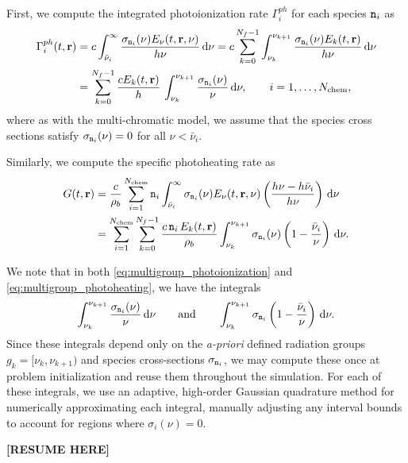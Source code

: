 \documentclass[10pt]{article}
\renewcommand{\(}{\left(}
\renewcommand{\)}{\right)}
\newcommand{\rvec}{{\bf r}}
\newcommand{\rhob}{\rho_b}
\newcommand{\Enu}{E_{\nu}}
\newcommand{\mn}{{\tt n}}
\begin{document}
First, we compute the integrated photoionization rate $\Gamma_i^{ph}$
for each species $\mn_i$ as 
\begin{align}
\label{eq:multigroup_photoionization}
   \Gamma_i^{ph}(t,\rvec)  &= 
   c \int_{\bar{\nu}_i}^{\infty} \frac{\sigma_{\mn_i}(\nu)\Enu(t,\rvec,\nu)}{h\nu}\,\mathrm d\nu =  
   c \sum_{k=0}^{N_f-1} \int_{\nu_k}^{\nu_{k+1}} \frac{\sigma_{\mn_i}(\nu) E_k(t,\rvec)}{h\nu}\,\mathrm d\nu \\
\notag
   &= \sum_{k=0}^{N_f-1} \frac{c E_k(t,\rvec)}{h}\,
   \int_{\nu_k}^{\nu_{k+1}} \frac{\sigma_{\mn_i}(\nu)}{\nu}\,\mathrm
   d\nu, \qquad i=1,\ldots,N_\text{chem},
\end{align}
where as with the multi-chromatic model, we assume that the species
cross sections satisfy $\sigma_{\mn_i}(\nu) = 0$ for all $\nu <
\bar{\nu}_i$.

Similarly, we compute the specific photoheating rate as 
\begin{align}
\notag
   G(t,\rvec) &= 
   \frac{c}{\rhob} \sum_{i=1}^{N_\text{chem}} \mn_i
     \int_{\bar{\nu}_i}^{\infty} \sigma_{\mn_i}(\nu) \Enu(t,\rvec,\nu)
     \left(\frac{h\nu - h\bar{\nu}_i}{h\nu}\right)\,\mathrm d\nu \\
\label{eq:multigroup_photoheating}
     &= 
   \sum_{i=1}^{N_\text{chem}} \sum_{k=0}^{N_f-1} \frac{c\,\mn_i\, E_k(t,\rvec)}{\rhob} 
     \int_{\nu_k}^{\nu_{k+1}} \sigma_{\mn_i}(\nu) 
     \left(1 - \frac{\bar{\nu}_i}{\nu}\right)\,\mathrm d\nu.
\end{align}

We note that in both \eqref{eq:multigroup_photoionization} and
\eqref{eq:multigroup_photoheating}, we have the integrals 
\begin{align}
  \label{eq:integrals} 
    \int_{\nu_k}^{\nu_{k+1}} \frac{\sigma_{\mn_i}(\nu)}{\nu}\,\mathrm d\nu
    \qquad\text{and}\qquad
    \int_{\nu_k}^{\nu_{k+1}} \sigma_{\mn_i} \left(1 - \frac{\bar{\nu}_i}{\nu}\right)\,\mathrm d\nu.
\end{align}
Since these integrals depend only on the {\em a-priori} defined
radiation groups $g_k=[\nu_k,\nu_{k+1})$ and species cross-sections
$\sigma_{\mn_i}$, we may compute these once at problem initialization
and reuse them throughout the simulation.  For each of these
integrals, we use an adaptive, high-order Gaussian quadrature
method for numerically approximating each integral, manually adjusting
any interval bounds to account for regions where $\sigma_i(\nu)=0$.




{\bf [RESUME HERE]}
\end{document}
